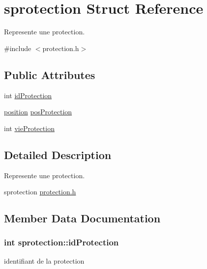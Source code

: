 \hypertarget{structsprotection}{}\section{sprotection Struct Reference}
\label{structsprotection}


Represente une protection.  




{\ttfamily \#include $<$protection.\+h$>$}

\subsection*{Public Attributes}
\begin{DoxyCompactItemize}
\item 
int \hyperlink{structsprotection_abac75798f4632672a8de0df6e8cb97ce}{id\+Protection}
\item 
\hyperlink{structsposition}{position} \hyperlink{structsprotection_afc4666e7ac4608fecc09f1633f9d8760}{pos\+Protection}
\item 
int \hyperlink{structsprotection_a94ddbe90697e9f7e8b3bb4010998d7af}{vie\+Protection}
\end{DoxyCompactItemize}


\subsection{Detailed Description}
Represente une protection. 

sprotection \hyperlink{protection_8h}{protection.\+h} 

\subsection{Member Data Documentation}
\subsubsection[{\texorpdfstring{id\+Protection}{idProtection}}]{\setlength{\rightskip}{0pt plus 5cm}int sprotection\+::id\+Protection}\hypertarget{structsprotection_abac75798f4632672a8de0df6e8cb97ce}{}\label{structsprotection_abac75798f4632672a8de0df6e8cb97ce}
identifiant de la protection 
